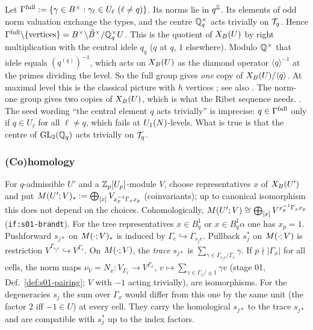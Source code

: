 \begin{remark}\label{rem:s02-normone}
Let $\Gamma^{\rm full}:=\{\gamma\in B^\times:\gamma_\ell\in U_\ell\ (\ell\ne q)\}$. Its norms lie in $q^{\mathbb{Z}}$. Its
elements of odd norm valuation exchange the types, and the centre $\mathbb{Q}_q^\times$ acts trivially on $\mathcal{T}_q$. Hence
$\Gamma^{\rm full}\backslash\{\text{vertices}\}=B^\times\backslash\hat{B}^\times/\mathbb{Q}_q^\times U$. This is the
quotient of $X_B(U)$ by right multiplication with the central idele $q_q$ ($q$ at $q$, $1$ elsewhere). Modulo
$\mathbb{Q}^\times$ that idele equals $(q^{(q)})^{-1}$, which acts on $X_B(U)$ as the diamond operator
$\langle q\rangle^{-1}$ at the primes dividing the level. So the full group gives \emph{one} copy of
$X_B(U)/\langle q\rangle$. At maximal level this is the classical picture with $h$ vertices
; see also
. The norm-one group gives
two copies of $X_B(U)$, which is what the Ribet sequence needs. \stsketch.
The seed wording ``the central element $q$ acts trivially'' is imprecise: $q\in\Gamma^{\rm full}$ only if
$q\in U_\ell$ for all $\ell\ne q$, which fails at $U_1(N)$-levels. What is true is that the centre of
$\mathrm{GL}_2(\mathbb{Q}_q)$ acts trivially on $\mathcal{T}_q$.
\end{remark}

\subsubsection*{(Co)homology}
\begin{definition}\label{def:s02-Mhom}
For $q$-admissible $U'$ and a $\mathbb{Z}_p[U_p]$-module $V$, choose representatives $x$ of $X_B(U')$ and put
$M(U';V)_*:=\bigoplus_{[x]}V_{x_p^{-1}\Gamma_xx_p}$ (coinvariants); up to canonical isomorphism this does
not depend on the choices. Cohomologically, $M(U';V)\cong\bigoplus_{[x]}V^{x_p^{-1}\Gamma_xx_p}$
(\texttt{if:s01-brandt}). For the tree representatives $x\in B^1_q$ or $x\in B^1_q\alpha$ one has $x_p=1$.
Pushforward $s_{j*}$ on $M(\cdot;V)_*$ is induced by $\Gamma_e\hookrightarrow\Gamma_{s_j e}$. Pullback
$s_j^*$ on $M(\cdot;V)$ is restriction $V^{\Gamma_{s_je}}\hookrightarrow V^{\Gamma_e}$. On
$M(\cdot;V)$, the \emph{trace} $s_{j*}$ is $\sum_{\gamma\in\Gamma_{s_je}/\Gamma_e}\gamma$.
If $p\nmid|\Gamma_x|$ for all cells, the norm maps $\nu_V=N_x:V_{\Gamma_x}\to V^{\Gamma_x}$, $v\mapsto\sum_{\gamma\in\Gamma_x/\pm1}\gamma v$
(stage 01, Def.~\ref{def:s01-pairing}; $V$ with $-1$ acting trivially),
are isomorphisms. For the degeneracies $s_j$ the sum over $\Gamma_x$ would differ from this one by the same unit (the factor $2$ iff $-1\in U$) at every cell.
They carry the homological $s_{j*}$ to the trace $s_{j*}$ and are compatible with $s_j^*$ up to
the index factors.
\end{definition}

